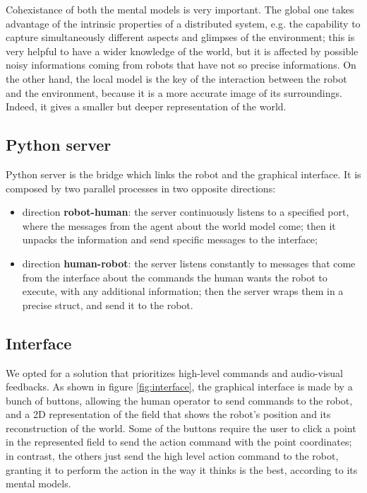 \documentclass[a4paper, onecolumn, 12pt]{article}
\begin{document}
Cohexistance of both the mental models is very important.
The global one takes advantage of the intrinsic properties of a 
distributed system, e.g. the capability to capture simultaneously different
aspects and glimpses of the environment; this is very helpful to have a wider
knowledge of the world, but it is affected by possible noisy informations coming 
from robots that have not so precise informations.
On the other hand, the local model is the key of the interaction between the robot and
the environment, because it is a more accurate image of its surroundings.
Indeed, it gives a smaller but deeper representation of the world.

\subsection{Python server}

Python server is the bridge which links the robot and the graphical 
interface. It is composed by two parallel processes in two opposite directions:
\begin{itemize}
    \item direction \textbf{robot-human}: the server continuously listens to a specified port, where
    the messages from the agent about the world model come; then it unpacks the information and send 
    specific messages to the interface;
    \item direction \textbf{human-robot}: the server listens constantly to messages that come from
    the interface about the commands the human wants the robot to execute, with any additional 
    information; then the server wraps them in a precise struct, and send it to the robot. 
     
\end{itemize} 

\subsection{Interface}
\label{subsec:interface}
We opted for a solution that prioritizes high-level commands and audio-visual
feedbacks. As shown in figure \ref{fig:interface}, the graphical interface is made by a bunch of buttons,
allowing the human operator to send commands to the robot, and a 2D representation of the
field that shows the robot's position and its reconstruction of the world.
Some of the buttons require the user to click a point in the represented field to
send the action command with the point coordinates; in contrast, the others just send
the high level action command to the robot, granting it to perform
the action in the way it thinks is the best, according to its mental models.
\end{document}

